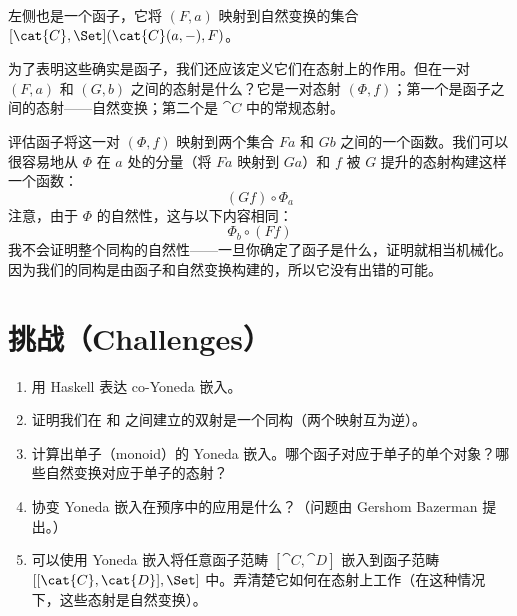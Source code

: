 左侧也是一个函子，它将 $(F, a)$ 映射到自然变换的集合 $[\cat{C}, \Set](\cat{C}(a, -), F)$。

为了表明这些确实是函子，我们还应该定义它们在态射上的作用。但在一对 $(F, a)$ 和 $(G, b)$ 之间的态射是什么？它是一对态射 $(\Phi, f)$；第一个是函子之间的态射——自然变换；第二个是 $\cat{C}$ 中的常规态射。

评估函子将这一对 $(\Phi, f)$ 映射到两个集合 $F a$ 和 $G b$ 之间的一个函数。我们可以很容易地从 $\Phi$ 在 $a$ 处的分量（将 $F a$ 映射到 $G a$）和 $f$ 被 $G$ 提升的态射构建这样一个函数：
\[(G f) \circ \Phi_a\]
注意，由于 $\Phi$ 的自然性，这与以下内容相同：
\[\Phi_b \circ (F f)\]
我不会证明整个同构的自然性——一旦你确定了函子是什么，证明就相当机械化。因为我们的同构是由函子和自然变换构建的，所以它没有出错的可能。

\section{挑战（Challenges）}

\begin{enumerate}
  \tightlist
  \item
  用 Haskell 表达 co-Yoneda 嵌入。
  \item
  证明我们在  和  之间建立的双射是一个同构（两个映射互为逆）。
  \item
  计算出单子（monoid）的 Yoneda 嵌入。哪个函子对应于单子的单个对象？哪些自然变换对应于单子的态射？
  \item
  协变 Yoneda 嵌入在预序中的应用是什么？（问题由 Gershom Bazerman 提出。）
  \item
  可以使用 Yoneda 嵌入将任意函子范畴 $[\cat{C}, \cat{D}]$ 嵌入到函子范畴 $[[\cat{C}, \cat{D}], \Set]$ 中。弄清楚它如何在态射上工作（在这种情况下，这些态射是自然变换）。
\end{enumerate}
